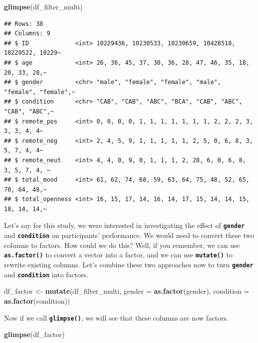 \documentclass[
]{book}
\newenvironment{Shaded}{\begin{snugshade}}{\end{snugshade}}
\newcommand{\AttributeTok}[1]{\textcolor[rgb]{0.13,0.29,0.53}{#1}}
\newcommand{\FunctionTok}[1]{\textcolor[rgb]{0.13,0.29,0.53}{\textbf{#1}}}
\newcommand{\NormalTok}[1]{#1}
\newcommand{\OtherTok}[1]{\textcolor[rgb]{0.56,0.35,0.01}{#1}}
\begin{document}
\begin{Shaded}
\begin{Highlighting}[]
\FunctionTok{glimpse}\NormalTok{(df\_filter\_multi)}
\end{Highlighting}
\end{Shaded}

\begin{verbatim}
## Rows: 38
## Columns: 9
## $ ID             <int> 10229436, 10230533, 10230659, 10428518, 10229522, 10229~
## $ age            <int> 26, 36, 45, 37, 30, 36, 28, 47, 46, 35, 18, 20, 33, 28,~
## $ gender         <chr> "male", "female", "female", "male", "female", "female",~
## $ condition      <chr> "CAB", "CAB", "ABC", "BCA", "CAB", "ABC", "CAB", "ABC",~
## $ remote_pos     <int> 0, 0, 0, 0, 1, 1, 1, 1, 1, 1, 1, 2, 2, 2, 3, 3, 3, 4, 4~
## $ remote_neg     <int> 2, 4, 5, 9, 1, 1, 1, 1, 1, 2, 5, 0, 6, 8, 3, 5, 7, 4, 4~
## $ remote_neut    <int> 4, 4, 0, 9, 0, 1, 1, 1, 2, 28, 6, 0, 6, 8, 3, 5, 7, 4, ~
## $ total_mood     <int> 61, 62, 74, 68, 59, 63, 64, 75, 48, 52, 65, 70, 64, 48,~
## $ total_openness <int> 16, 15, 17, 14, 16, 14, 17, 15, 14, 14, 15, 18, 14, 14,~
\end{verbatim}

Let's say for this study, we were interested in investigating the effect of \textbf{\texttt{gender}} and \textbf{\texttt{condition}} on participants' performance. We would need to convert these two columns to factors. How could we do this? Well, if you remember, we can use \textbf{\texttt{as.factor()}} to convert a vector into a factor, and we can use \textbf{\texttt{mutate()}} to rewrite existing columns. Let's combine these two approaches now to turn \textbf{\texttt{gender}} and \textbf{\texttt{condition}} into factors.

\begin{Shaded}
\begin{Highlighting}[]
\NormalTok{df\_factor }\OtherTok{\textless{}{-}} \FunctionTok{mutate}\NormalTok{(df\_filter\_multi,}
                    \AttributeTok{gender =} \FunctionTok{as.factor}\NormalTok{(gender),}
                    \AttributeTok{condition =} \FunctionTok{as.factor}\NormalTok{(condition))}
\end{Highlighting}
\end{Shaded}

Now if we call \textbf{\texttt{glimpse()}}, we will see that these columns are now factors.

\begin{Shaded}
\begin{Highlighting}[]
\FunctionTok{glimpse}\NormalTok{(df\_factor)}
\end{Highlighting}
\end{Shaded}
\end{document}
